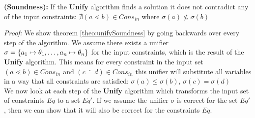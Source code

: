 \documentclass[runningheads]{llncs}
\begin{document}
\begin{theoremAndi}
  \label{theo:unifySoundness}
  \textbf{(Soundness):}
  If the \textbf{Unify} algorithm finds a solution it does not contradict any of the input constraints:
  $\nexists (a \lessdot b) \in {Cons}_{in}$ where $\sigma(a) \nleq \sigma(b)$  
\end{theoremAndi}
\textit{Proof:}
We show theorem \ref{theo:unifySoundness} by going backwards over every step of the algorithm.
We assume there exists a unifier $\sigma = \{ a_1 \mapsto \theta_1, \ldots , a_n \mapsto \theta_n \}$ for the input constraints,
which is the result of the \textbf{Unify} algorithm.
This means for every constraint in the input set $(a \lessdot b) \in {Cons}_{in}$ and $(c \doteq d) \in {Cons}_{in}$
this unifier will substitute all variables in a way that all constraints are satisfied:
$\sigma(a) \leq \sigma(b)$, $\sigma(c) = \sigma(d)$\\

We now look at each step of the \textbf{Unify} algorithm
which transforms the input set of constraints $Eq$ to a set $Eq'$.
If we assume the unifier $\sigma$ is correct for the set $Eq'$,
then we can show that it will also be correct for the constraints $Eq$. 


\end{document}
